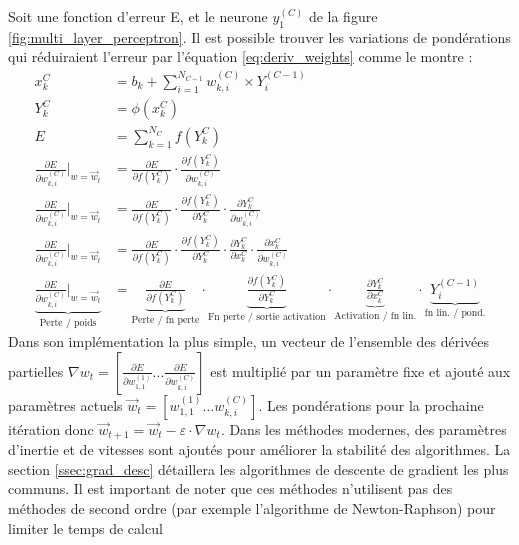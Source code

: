       Soit une fonction d'erreur E, et le neurone $ y^{(C)}_1 $ de la figure \ref{fig:multi_layer_perceptron}. Il est possible trouver les variations de pondérations qui réduiraient l'erreur par l'équation \ref{eq:deriv_weights} comme le montre \textcite{rumelhart_learning_1986}:
      \begin{align}
        x^{C}_k &= b_k + \sum_{i=1}^{N_{C-1}} w^{(C)}_{k,i} \times Y^{(C-1)}_i\\
        Y^{C}_k &= \phi(x^{C}_k)\\
        E &= \sum^{N_C}_{k=1} f(Y^{C}_k)\\
        \frac{\partial{E}}{\partial{w^{(C)}_{k,i}}}\bigg|_{w=\overrightarrow{w}_{t}} &= \frac{\partial{E}}{\partial{f(Y^{C}_k)}} \cdot \frac{\partial{f(Y^{C}_k)}}{\partial{w^{(C)}_{k,i}}}\\
        \frac{\partial{E}}{\partial{w^{(C)}_{k,i}}}\bigg|_{w=\overrightarrow{w}_{t}} &= \frac{\partial{E}}{\partial{f(Y^{C}_k)}} \cdot \frac{\partial{f(Y^{C}_k)}}{\partial{Y^{C}_k}} \cdot \frac{\partial{Y^{C}_k}}{\partial{w^{(C)}_{k,i}}} \\
        \frac{\partial{E}}{\partial{w^{(C)}_{k,i}}}\bigg|_{w=\overrightarrow{w}_{t}} &= \frac{\partial{E}}{\partial{f(Y^{C}_k)}} \cdot \frac{\partial{f(Y^{C}_k)}}{\partial{Y^{C}_k}} \cdot \frac{\partial{Y^{C}_k}}{\partial{x^{C}_k}} \cdot \frac{\partial{x^{C}_k}}{\partial{w^{(C)}_{k,i}}}\\
        \underbrace{\frac{\partial{E}}{\partial{w^{(C)}_{k,i}}}\bigg|_{w=\overrightarrow{w}_{t}}}_\text{Perte / poids} &= \underbrace{\frac{\partial{E}}{\partial{f(Y^{C}_k)}}}_\text{Perte / fn perte} \cdot \underbrace{\frac{\partial{f(Y^{C}_k)}}{\partial{Y^{C}_k}}}_\text{Fn perte / sortie activation} \cdot \underbrace{\frac{\partial{Y^{C}_k}}{\partial{x^{C}_k}}}_\text{Activation / fn lin.} \cdot \underbrace{Y^{(C-1)}_i}_\text{fn lin. / pond.}\label{eq:deriv_weights}
      \end{align}
    Dans son implémentation la plus simple, un vecteur de l'ensemble des dérivées partielles $\nabla{w_{t}} = \left[ \frac{\partial{E}}{\partial{w^{(1)}_{1,1}}} \ldots \frac{\partial{E}}{\partial{w^{(C)}_{k,i}}} \right] $ est multiplié par un paramètre fixe et ajouté aux paramètres actuels $\overrightarrow{w}_{t} = \left[w^{(1)}_{1,1} \ldots w^{(C)}_{k,i}  \right] $. Les pondérations pour la prochaine itération donc $\overrightarrow{w}_{t+1} = \overrightarrow{w}_{t} - \varepsilon \cdot \nabla{w_{t}} $. Dans les méthodes modernes, des paramètres d'inertie et de vitesses sont ajoutés pour améliorer la stabilité des algorithmes. La section \ref{ssec:grad_desc} détaillera les algorithmes de descente de gradient les plus communs. Il est important de noter que ces méthodes n'utilisent pas des méthodes de second ordre (par exemple l'algorithme de Newton-Raphson) pour limiter le temps de calcul 
